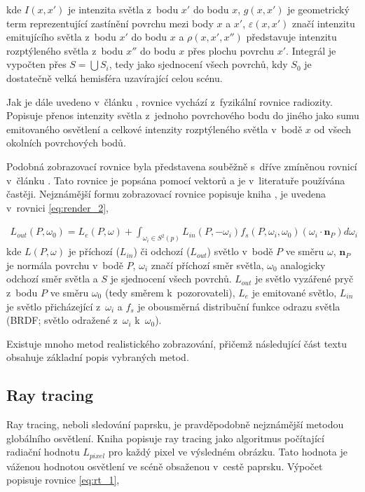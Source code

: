 kde $I(x, x')$ je intenzita světla z~bodu $x'$ do bodu $x$, $g(x, x')$ je geometrický term reprezentující zastínění povrchu mezi body $x$ a $x'$, $\varepsilon(x, x')$ značí intenzitu emitujícího světla z~bodu $x'$ do bodu $x$ a $\rho(x, x', x'')$ představuje intenzitu rozptýleného světla z~bodu $x''$ do bodu $x$ přes plochu povrchu $x'$. Integrál je vypočten přes $S = \bigcup S_i$, tedy jako sjednocení všech povrchů, kdy $S_0$ je dostatečně velká hemisféra uzavírající celou scénu.

Jak je dále uvedeno v~článku \cite{render_eq}, rovnice vychází z~fyzikální rovnice radiozity. Popisuje přenos intenzity světla z~jednoho povrchového bodu do jiného jako sumu emitovaného osvětlení a celkové intenzity rozptýleného světla v~bodě $x$ od všech okolních povrchových bodů.

Podobná zobrazovací rovnice byla představena souběžně s~dříve zmíněnou rovnicí v~článku \cite{render_eq_2}. Tato rovnice je popsána pomocí vektorů a je v~literatuře používána častěji. Nejznámější formu zobrazovací rovnice popisuje kniha \cite{gfx_principles_practice}, je uvedena v~rovnici \ref{eq:render_2},

\begin{equation} \label{eq:render_2}
	\begin{gathered}
		L_{out}(P, \omega_0) = L_e(P, \omega) + \int_{\omega_i\in S^2(p)}L_{in}(P, -\omega_i)f_s(P, \omega_i, \omega_0)(\omega_i \cdot \textbf{n}_P)d\omega_i
	\end{gathered}
\end{equation}
kde $L(P, \omega)$ je příchozí ($L_{in}$) či odchozí ($L_{out}$) světlo v~bodě $P$ ve směru $\omega$, $\textbf{n}_P$ je normála povrchu v~bodě $P$, $\omega_i$ značí příchozí směr světla, $\omega_0$ analogicky odchozí směr světla a $S$ je sjednocení všech povrchů. $L_{out}$ je světlo vyzářené pryč z~bodu $P$ ve směru $\omega_0$ (tedy směrem k~pozorovateli), $L_e$ je emitované světlo, $L_{in}$ je světlo přicházející z~$\omega_i$ a $f_s$ je obousměrná distribuční funkce odrazu světla (BRDF; světlo odražené z~$\omega_i$ k~$\omega_0$).

Existuje mnoho metod realistického zobrazování, přičemž následující část textu obsahuje základní popis vybraných metod.

\subsection{Ray tracing}\label{sec:ray_tracing}
Ray tracing, neboli sledování paprsku, je pravděpodobně nejznámější metodou globálního osvětlení. Kniha \cite{advanced_global} popisuje ray tracing jako algoritmus počítající radiační hodnotu $L_{pixel}$ pro každý pixel ve výsledném obrázku. Tato hodnota je váženou hodnotou osvětlení ve scéně obsaženou v~cestě paprsku. Výpočet popisuje rovnice \ref{eq:rt_1},

